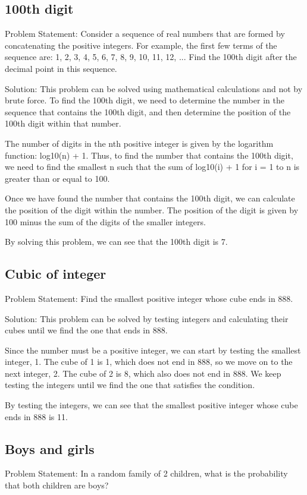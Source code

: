 \documentclass[12pt, a4paper, oneside]{article}
\begin{document}
\subsection{ 100th digit }
Problem Statement:
Consider a sequence of real numbers that are formed by concatenating the positive integers. For example, the first few terms of the sequence are: 1, 2, 3, 4, 5, 6, 7, 8, 9, 10, 11, 12, ... Find the 100th digit after the decimal point in this sequence.

Solution:
This problem can be solved using mathematical calculations and not by brute force. To find the 100th digit, we need to determine the number in the sequence that contains the 100th digit, and then determine the position of the 100th digit within that number.

The number of digits in the nth positive integer is given by the logarithm function: log10(n) + 1. Thus, to find the number that contains the 100th digit, we need to find the smallest n such that the sum of log10(i) + 1 for i = 1 to n is greater than or equal to 100.

Once we have found the number that contains the 100th digit, we can calculate the position of the digit within the number. The position of the digit is given by 100 minus the sum of the digits of the smaller integers.

By solving this problem, we can see that the 100th digit is 7.
\subsection{ Cubic of integer }
Problem Statement:
Find the smallest positive integer whose cube ends in 888.

Solution:
This problem can be solved by testing integers and calculating their cubes until we find the one that ends in 888.

Since the number must be a positive integer, we can start by testing the smallest integer, 1. The cube of 1 is 1, which does not end in 888, so we move on to the next integer, 2. The cube of 2 is 8, which also does not end in 888. We keep testing the integers until we find the one that satisfies the condition.

By testing the integers, we can see that the smallest positive integer whose cube ends in 888 is 11.
\subsection{ Boys and girls }
Problem Statement:
In a random family of 2 children, what is the probability that both children are boys?
\end{document}
